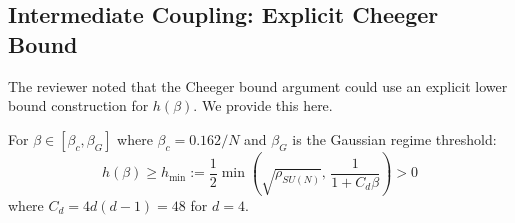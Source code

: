 \subsection{Intermediate Coupling: Explicit Cheeger Bound}
\label{ssec:cheeger-explicit}

The reviewer noted that the Cheeger bound argument could use an explicit lower
bound construction for $h(\beta)$. We provide this here.

\begin{theorem}
\label{thm:cheeger-explicit-response}
For $\beta \in [\beta_c, \beta_G]$ where $\beta_c = 0.162/N$ and $\beta_G$ is the 
Gaussian regime threshold:
\begin{equation}
h(\beta) \geq h_{\min} := \frac{1}{2} \min\left(\sqrt{\rho_{SU(N)}}, \, \frac{1}{1 + C_d \beta}\right) > 0
\end{equation}
where $C_d = 4d(d-1) = 48$ for $d = 4$.
\end{theorem}

